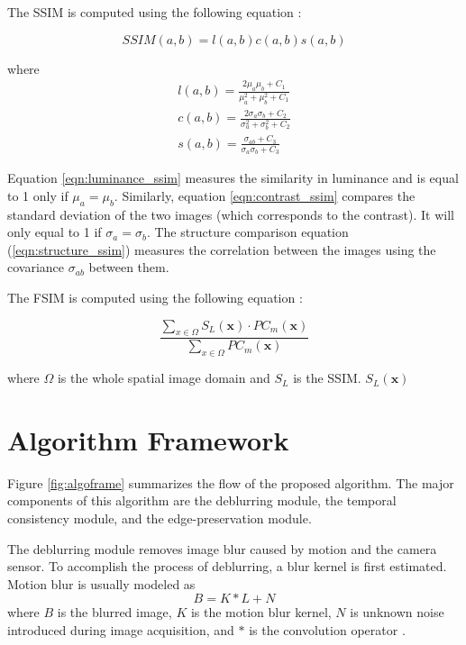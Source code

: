 The SSIM is computed using the following equation \citep{Hore2010}:

\begin{equation}
SSIM(a,b) = l(a,b) c(a,b) s(a,b)
\end{equation}

where
\begin{eqnarray}
l(a,b) = \frac{2\mu_a\mu_b+C_1}{\mu_a^2+\mu_b^2+C_1} \label{eqn:luminance_ssim}\\
c(a,b) = \frac{2\sigma_a\sigma_b+C_2}{\sigma_a^2+\sigma_b^2+C_2}\label{eqn:contrast_ssim}\\
s(a,b) = \frac{\sigma_{ab}+C_3}{\sigma_a\sigma_b+C_3}\label{eqn:structure_ssim}
\end{eqnarray}

Equation \ref{eqn:luminance_ssim} measures the similarity in luminance and is equal to 1 only if $\mu_a=\mu_b$.
Similarly, equation \ref{eqn:contrast_ssim} compares the standard deviation of the two images (which corresponds to the contrast). 
It will only equal to 1 if $\sigma_a=\sigma_b$.
The structure comparison equation (\ref{eqn:structure_ssim}) measures the correlation between the images using the covariance $\sigma_{ab}$ between them.

The FSIM is computed using the following equation \citep{Zhang2011a}:

\begin{equation}
\frac{\sum_{x\in\Omega}S_L(\mathbf{x})\cdot PC_m(\mathbf{x})}{{\sum_{x\in\Omega}PC_m(\mathbf{x})}}
\end{equation}

where $\Omega$ is the whole spatial image domain and $S_L$ is the SSIM.
$S_L(\mathbf{x})$

\section{Algorithm Framework}

Figure \ref{fig:algoframe} summarizes the flow of the proposed algorithm.
The major components of this algorithm are the deblurring module, the temporal consistency module, and the edge-preservation module.

The deblurring module removes image blur caused by motion and the camera sensor.
To accomplish the process of deblurring, a blur kernel is first estimated.
Motion blur is usually modeled as
\begin{equation}
	B = K * L + N	
\end{equation}
where $B$ is the blurred image, $K$ is the motion blur kernel, $N$ is unknown noise introduced during image acquisition, and $*$ is the convolution operator \citep{Cho2009}.

